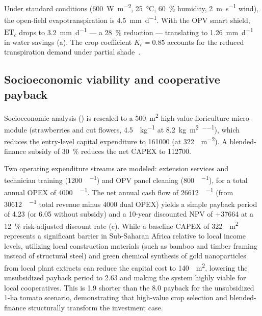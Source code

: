 \documentclass[onecolumn,a4paper,12pt]{article}
\begin{document}
Under standard conditions (\qty{600}{\W\per\m\squared}, \qty{25}{\celsius}, \qty{60}{\percent} humidity, \qty{2}{\m\per\s} wind), the open-field evapotranspiration is \qty{4.5}{\mm\per\day}.
With the OPV smart shield, $\mathrm{ET}_c$ drops to \qty{3.2}{\mm\per\day} --- a \qty{28}{\percent} reduction --- translating to \qty{1.26}{\mm\per\day} in water savings (a).
The crop coefficient $K_c = 0.85$ accounts for the reduced transpiration demand under partial shade~\cite{Allen1998}.

\subsection*{Socioeconomic viability and cooperative payback}

Socioeconomic analysis () is rescaled to a \qty{500}{\m\squared} high-value floriculture micro-module (strawberries and cut flowers, \qty{4.5}{\USD\per\kg} at \qty{8.2}{\kg\per\m\squared\per\yr}), which reduces the entry-level capital expenditure to \qty{161000}{\USD} (at \qty{322}{\USD\per\m\squared}).
A blended-finance subsidy of \qty{30}{\percent} reduces the net CAPEX to \qty{112700}{\USD}.

Two operating expenditure streams are modeled: extension services and technician training (\qty{1200}{\USD\per\yr}) and OPV panel cleaning (\qty{800}{\USD\per\yr}), for a total annual OPEX of \qty{4000}{\USD\per\yr}.
The net annual cash flow of \qty{26612}{\USD\per\yr} (from \qty{30612}{\USD\per\yr} total revenue minus \qty{4000}{\USD} dual OPEX) yields a simple payback period of \qty{4.23}{\yr} (or \qty{6.05}{\yr} without subsidy) and a 10-year discounted NPV of $+$\qty{37664}{\USD} at a \qty{12}{\percent} risk-adjusted discount rate (c).
While a baseline CAPEX of \qty{322}{\per\m\squared} represents a significant barrier in Sub-Saharan Africa relative to local income levels, utilizing local construction materials (such as bamboo and timber framing instead of structural steel) and green chemical synthesis of gold nanoparticles from local plant extracts can reduce the capital cost to \qty{140}{\per\m\squared}, lowering the unsubsidized payback period to \qty{2.63}{\yr} and making the system highly viable for local cooperatives.
This is \qty{1.9}{\times} shorter than the \qty{8.0}{\yr} payback for the unsubsidized 1-ha tomato scenario, demonstrating that high-value crop selection and blended-finance structurally transform the investment case.
\end{document}
